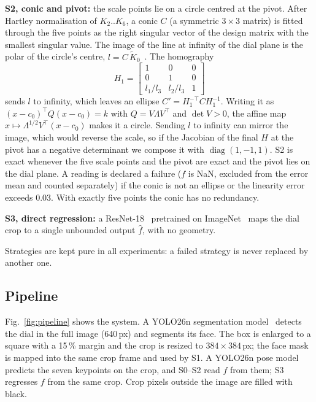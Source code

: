 \documentclass[conference]{IEEEtran}
\begin{document}
\textbf{S2, conic and pivot:} the scale points lie on a circle centred at the pivot. After Hartley normalisation
of $K_2..K_6$, a conic $C$ (a symmetric $3\times3$ matrix) is fitted through the five points as the right singular
vector of the design matrix with the smallest singular value. The image of the line at infinity of the dial
plane is the polar of the circle's centre, $l = C\,\tilde K_0$~\cite{hartley2004}. The homography
\begin{equation}
H_1=\begin{bmatrix}1&0&0\\0&1&0\\ l_1/l_3 & l_2/l_3 & 1\end{bmatrix}
\end{equation}
sends $l$ to infinity, which leaves an ellipse $C'=H_1^{-\top}CH_1^{-1}$. Writing it as $(x-c_0)^{\top}Q(x-c_0)=k$ with
$Q=V\Lambda V^{\top}$ and $\det V>0$, the affine map $x\mapsto \Lambda^{1/2}V^{\top}(x-c_0)$ makes it a circle.
Sending $l$ to infinity can mirror the image, which would reverse the scale, so if the Jacobian of the final
$H$ at the pivot has a negative determinant we compose it with $\operatorname{diag}(1,-1,1)$. S2 is exact
whenever the five scale points and the pivot are exact and the pivot lies on the dial plane. A reading is
declared a failure ($f$ is NaN, excluded from the error mean and counted separately) if the conic is not an
ellipse or the linearity error exceeds 0.03. With exactly five points the conic has no redundancy.

\textbf{S3, direct regression:} a ResNet-18~\cite{he2016} pretrained on ImageNet~\cite{deng2009} maps the dial
crop to a single unbounded output $\hat f$, with no geometry.

Strategies are kept pure in all experiments: a failed strategy is never replaced by another one.

\subsection{Pipeline}
Fig.~\ref{fig:pipeline} shows the system. A YOLO26n segmentation model~\cite{jocher2026} detects the dial in the
full image (640\,px) and segments its face. The box is enlarged to a square with a 15\,\% margin and the crop is
resized to $384\times384$\,px; the face mask is mapped into the same crop frame and used by S1. A YOLO26n pose
model predicts the seven keypoints on the crop, and S0--S2 read $f$ from them; S3 regresses $f$ from the same
crop. Crop pixels outside the image are filled with black.
\end{document}
